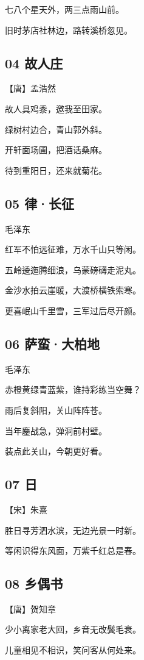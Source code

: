 \documentclass[a6paper, 12pt]{article}
\begin{document}
七八个星天外，两三点雨山前。

旧时茅店社林边，路转溪桥忽见。

\subsection*{04 故人庄}

【唐】孟浩然
   
故人具鸡黍，邀我至田家。

绿树村边合，青山郭外斜。

开轩面场圃，把酒话桑麻。

待到重阳日，还来就菊花。

\subsection*{05 律·长征}

毛泽东

红军不怕远征难，万水千山只等闲。

五岭逶迤腾细浪，乌蒙磅礴走泥丸。

金沙水拍云崖暖，大渡桥横铁索寒。

更喜岷山千里雪，三军过后尽开颜。

\subsection*{06 萨蛮·大柏地}

毛泽东

赤橙黄绿青蓝紫，谁持彩练当空舞？

雨后复斜阳，关山阵阵苍。

当年鏖战急，弹洞前村壁。

装点此关山，今朝更好看。

\subsection*{07 日}

【宋】朱熹

胜日寻芳泗水滨，无边光景一时新。

等闲识得东风面，万紫千红总是春。

\subsection*{08 乡偶书}

【唐】贺知章

少小离家老大回，乡音无改鬓毛衰。

儿童相见不相识，笑问客从何处来。
\end{document}
